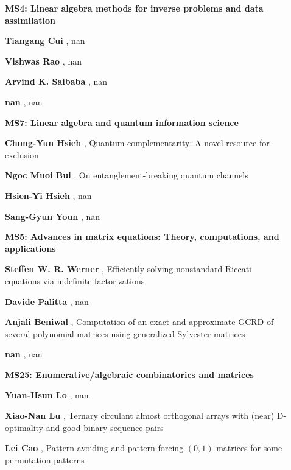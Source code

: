 \documentclass[ILAS2025-program.tex]{subfiles}
\begin{document}
\begin{description}
\begin{description}
    \item[] {\color{mstitle}\textbf{MS4: Linear algebra methods for inverse problems and data assimilation}} 
    \item[] \textbf{Tiangang Cui} , nan
        \item[] \textbf{Vishwas Rao} , nan
        \item[] \textbf{Arvind K. Saibaba} , nan
        \item[] \textbf{nan} , nan
        \end{description}
    \begin{description}
    \item[] {\color{mstitle}\textbf{MS7: Linear algebra and quantum information science}} 
    \item[] \textbf{Chung-Yun Hsieh} , Quantum complementarity: A novel resource for exclusion
        \item[] \textbf{Ngoc Muoi Bui} , On entanglement-breaking quantum channels
        \item[] \textbf{Hsien-Yi Hsieh} , nan
        \item[] \textbf{Sang-Gyun Youn} , nan
        \end{description}
    \begin{description}
    \item[] {\color{mstitle}\textbf{MS5: Advances in matrix equations: Theory, computations, and applications}} 
    \item[] \textbf{Steffen W. R. Werner} , Efficiently solving nonstandard Riccati equations via indefinite factorizations
        \item[] \textbf{Davide Palitta} , nan
        \item[] \textbf{Anjali Beniwal} , Computation of an exact and approximate GCRD of several polynomial matrices using generalized Sylvester matrices
        \item[] \textbf{nan} , nan
        \end{description}
    \begin{description}
    \item[] {\color{mstitle}\textbf{MS25: Enumerative/algebraic combinatorics and matrices}} 
    \item[] \textbf{Yuan-Hsun Lo} , nan
        \item[] \textbf{Xiao-Nan Lu} , Ternary circulant almost orthogonal arrays with (near) D-optimality and good binary sequence pairs
        \item[] \textbf{Lei Cao} , Pattern avoiding and pattern forcing $(0,1)$-matrices for some permutation patterns


\end{description}
\end{description}
\end{document}
